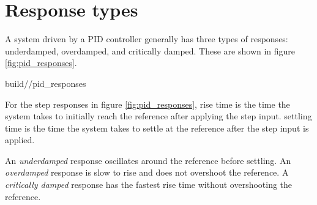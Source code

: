 \section{Response types}

A \gls{system} driven by a PID controller generally has three types of
responses: underdamped, overdamped, and critically damped. These are shown in
figure \ref{fig:pid_responses}.
\begin{svg}{build/\chapterpath/pid_responses}
  \caption{PID controller response types}
  \label{fig:pid_responses}
\end{svg}

For the \glspl{step response} in figure \ref{fig:pid_responses}, \gls{rise time}
is the time the \gls{system} takes to initially reach the \gls{reference} after
applying the \gls{step input}. \Gls{settling time} is the time the \gls{system}
takes to settle at the \gls{reference} after the \gls{step input} is applied.

An \textit{underdamped} response oscillates around the \gls{reference} before
settling. An \textit{overdamped} response is slow to rise and does not overshoot
the \gls{reference}. A \textit{critically damped} response has the fastest
\gls{rise time} without overshooting the \gls{reference}.
